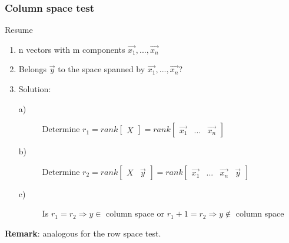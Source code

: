 \begin{frame}
	\frametitle{Column space test}
	\begin{block}{Resume}
		\begin{enumerate}
			\item n vectors with m components $\overrightarrow{x_1},...,\overrightarrow{x_n}$
			\item Belongs $\overrightarrow{y}$ to the space spanned by $\overrightarrow{x_1},...,\overrightarrow{x_n}$?
			\item Solution:
				\begin{description}
					\item[a)] Determine $r_1=rank\begin{bmatrix} X\end{bmatrix}=rank\begin{bmatrix} \overrightarrow{x_1} & ... & \overrightarrow{x_n} \end{bmatrix}$
					\item[b)] Determine $r_2=rank\begin{bmatrix} X & \overrightarrow{y}\end{bmatrix}=rank\begin{bmatrix} \overrightarrow{x_1} & ... & \overrightarrow{x_n} & \overrightarrow{y} \end{bmatrix}$
					\item[c)] Is $r_1=r_2 \Rightarrow y\in$ column space or $r_1+1=r_2 \Rightarrow y\not\in$ column space
				\end{description}
		\end{enumerate}
		\vspace{2mm}
		{\bf Remark}: analogous for the row space test.
	\end{block}
\end{frame}

